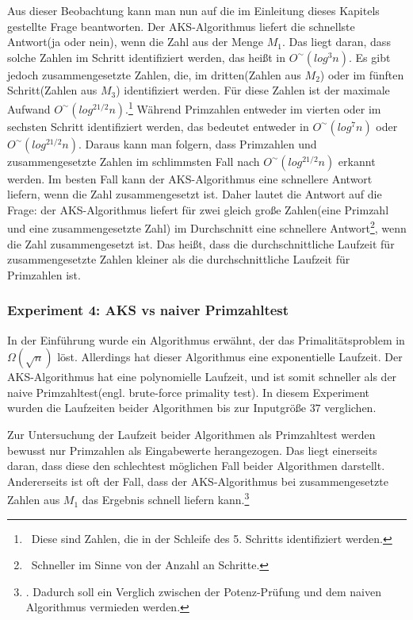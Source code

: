 \documentclass[12pt,oneside]{article}
\theoremstyle{remark}
\theoremstyle{definition}
\begin{document}
Aus dieser Beobachtung kann man nun auf die im Einleitung dieses Kapitels gestellte Frage beantworten. Der AKS-Algorithmus liefert die schnellste Antwort(ja oder nein), wenn die Zahl aus der Menge $M_1$. Das liegt daran, dass solche Zahlen im Schritt identifiziert werden, das heißt in $O^{\sim}(log^3 n)$. Es gibt jedoch zusammengesetzte Zahlen, die, im dritten(Zahlen aus $M_2$) oder im fünften Schritt(Zahlen aus $M_3$) identifiziert werden. Für diese Zahlen ist der maximale Aufwand $O^{\sim}(log^{21/2}n)$.\footnote{$\,$ Diese sind Zahlen, die in der Schleife des 5. Schritts identifiziert werden.} Während Primzahlen entweder im vierten oder im sechsten Schritt identifiziert werden, das bedeutet entweder in $O^{\sim}(log^7n)$ oder $O^{\sim}(log^{21/2}n)$. Daraus kann man folgern, dass Primzahlen und zusammengesetzte Zahlen im schlimmsten Fall nach $O^{\sim}(log^{21/2}n)$ erkannt werden. Im besten Fall kann der AKS-Algorithmus eine schnellere Antwort liefern, wenn die Zahl zusammengesetzt ist. Daher lautet die Antwort auf die Frage: der AKS-Algorithmus liefert für zwei gleich große Zahlen(eine Primzahl und eine zusammengesetzte Zahl) im Durchschnitt eine schnellere Antwort\footnote{$\,$ Schneller im Sinne von der Anzahl an Schritte.}, wenn die Zahl zusammengesetzt ist. Das heißt, dass die durchschnittliche Laufzeit für zusammengesetzte Zahlen kleiner als die durchschnittliche Laufzeit für Primzahlen ist.      

\subsubsection{Experiment 4: AKS vs naiver Primzahltest}
In der Einführung wurde ein Algorithmus erwähnt, der das Primalitätsproblem in $\Omega(\sqrt{n})$ löst. Allerdings hat dieser Algorithmus eine exponentielle Laufzeit. Der AKS-Algorithmus hat eine polynomielle Laufzeit, und ist somit schneller als der naive Primzahltest(engl. brute-force primality test). In diesem Experiment wurden die Laufzeiten beider Algorithmen bis zur Inputgröße $37$ verglichen.  

Zur Untersuchung der Laufzeit beider Algorithmen als Primzahltest werden bewusst nur Primzahlen als Eingabewerte herangezogen. Das liegt einerseits daran, dass diese den schlechtest möglichen Fall beider Algorithmen darstellt. Andererseits ist oft der Fall, dass der AKS-Algorithmus bei zusammengesetzte Zahlen aus $M_1$ das Ergebnis  schnell liefern kann.\footnote{. Dadurch soll ein Verglich zwischen der Potenz-Prüfung und dem naiven Algorithmus vermieden werden.}
\end{document}
